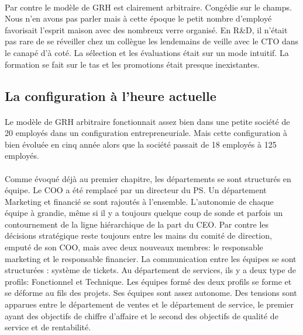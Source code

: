 \paragraph{}Par contre le modèle de GRH est clairement arbitraire\citep[pp. 115-119]{pichault}. Congédie sur le champs. Nous n'en avons pas parler mais à cette époque le petit nombre d'employé favorisait l'esprit maison avec des nombreux verre organisé. En R\&D, il n'était pas rare de se réveiller chez un collègue les lendemains de veille avec le CTO dans le canapé d'à coté. La sélection et les évaluations était sur un mode intuitif.  La formation se fait sur le tas et les promotions était presque inexistantes. 

\subsection{La configuration à l'heure actuelle}
\paragraph{} Le modèle de GRH arbitraire fonctionnait assez bien dans une petite société de 20 employés dans un configuration entrepreneuriale. Mais cette configuration à bien évoluée en cinq année alors que la société passait de 18 employés à 125 employés. 

\paragraph{} Comme évoqué déjà au premier chapitre, les départements se sont structurés en équipe. Le COO a été remplacé par un directeur du PS. Un département Marketing et financié se sont rajoutés à l'ensemble. L'autonomie de chaque équipe à grandie, même si il y a toujours quelque coup de sonde et parfois un contournement de la ligne hiérarchique de la part du CEO. Par contre les décisions stratégique reste toujours entre les mains du comité de direction, emputé de son COO, mais avec deux nouveaux membres: le responsable marketing et le responsable financier. La communication entre les équipes se sont structurées : système de tickets. Au département de services, ils y a deux type de profils: Fonctionnel et Technique. Les équipes formé des deux profils se forme et se déforme au fils des projets. Ses équipes sont assez autonome. Des tensions sont apparues entre le département de ventes et le département de service, le premier ayant des objectifs de chiffre d'affaire et le second des objectifs de qualité de service et de rentabilité.

